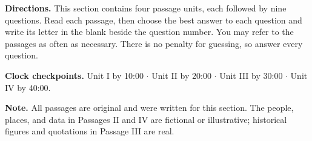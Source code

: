 \documentclass[11pt]{article}
\begin{document}
\maketitleblock

\begin{abstract}
This is a complete, original practice section built to Enhanced ACT Reading specifications: four passage units with nine questions each, 36 questions in 40 minutes. It uses the format combination of two single passages, one paired set, and one passage with a figure, so every passage format appears. The four units cover the four content areas---Literary Narrative, Social Science, Humanities, and Natural Science---and the questions follow ACT's reporting-category proportions (about 47\% Key Ideas \& Details, 31\% Craft \& Structure, and 22\% Integration of Knowledge \& Ideas). The answer key on the final pages gives each answer, the textual evidence behind it, and the rule from Volume~1 it tests, along with a diagnostic table by category.
\end{abstract}


\begin{notebox}
\small
\textbf{Directions.} This section contains four passage units, each followed by nine questions. Read each passage, then choose the best answer to each question and write its letter in the blank beside the question number. You may refer to the passages as often as necessary. There is no penalty for guessing, so answer every question.\par\vspace{3pt}
\textbf{Clock checkpoints.} Unit I by 10:00 $\cdot$ Unit II by 20:00 $\cdot$ Unit III by 30:00 $\cdot$ Unit IV by 40:00.\par\vspace{3pt}
\textbf{Note.} All passages are original and were written for this section. The people, places, and data in Passages II and IV are fictional or illustrative; historical figures and quotations in Passage III are real.
\end{notebox}
\end{document}
